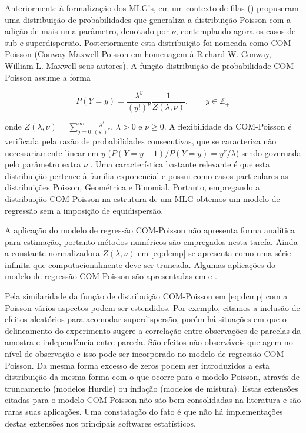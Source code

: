 \documentclass[
12pt,				%
openright,			%
oneside,			%
a4paper,			%
english,			%
brazil,				%
]{abntex2}
\begin{document}
Anteriormente à formalização dos MLG's, em um contexto de filas
 (\citeyear{Conway1962}) propuseram uma
distribuição de probabilidades que 
generaliza a distribuição Poisson com a adição de mais uma parâmetro,
denotado por $\nu$, contemplando agora os casos de sub e
superdispersão. Posteriormente esta distribuição foi nomeada como 
COM-Poisson (Conway-Maxwell-Poisson em homenagem à Richard W. Conway,
William L. Maxwell seus autores). A função distribuição de probabilidade
COM-Poisson assume a forma

\begin{equation} \label{eq:dcmp}
  P(Y = y) = \frac{\lambda^y}{(y!)^\nu} \frac{1}{Z(\lambda, \nu)}, \qquad
  y \in \mathbb{Z}_+
\end{equation}

\noindent
onde $Z(\lambda, \nu) = \sum_{j=0}^\infty \frac{\lambda^s}{(s!)^\nu}$,
$\lambda > 0$ e $\nu \geq 0$. A flexibilidade da COM-Poisson é
verificada pela razão de probabilidades consecutivas, que se caracteriza
não necessariamente linear em $y$ ($P(Y = y - 1) / P(Y = y) = y^\nu /
\lambda$) sendo governada pelo parâmetro extra $\nu$
\cite{Shmueli2005}. Uma característica bastante relevante é que esta
distribuição 
pertence à família exponencial e possui como casos particulares as
distribuições Poisson, Geométrica e Binomial. Portanto, empregando a
distribuição COM-Poisson na estrutura de um MLG obtemos um modelo de
regressão sem a imposição de equidispersão. 

A aplicação do modelo de regressão COM-Poisson não apresenta forma
analítica para estimação, portanto métodos numéricos são empregados
nesta tarefa. Ainda a constante normalizadora $Z(\lambda, \nu)$ em
\ref{eq:dcmp} se apresenta como uma série infinita que
computacionalmente deve ser truncada. Algumas aplicações do modelo
de regressão COM-Poisson são apresentadas em  e
.

Pela similaridade da função de distribuição COM-Poisson em \ref{eq:dcmp}
com a Poisson vários aspectos podem ser estendidos. Por exemplo, citamos
a inclusão de efeitos aleatórios para acomodar superdispersão, porém há
situações em que o delineamento do experimento sugere a correlação entre
observações de parcelas da amostra e independência entre parcela. São
efeitos não observáveis que agem no nível de observação e isso pode ser
incorporado no modelo de regressão COM-Poisson. Da mesma forma excesso
de zeros podem ser introduzidos a esta distribuição da mesma forma com o
que ocorre para o modelo Poisson, através de truncamento (modelos
Hurdle) ou inflação (modelos de mistura). Estas extensões citadas para o
modelo COM-Poisson não são bem consolidadas na literatura e são raras
suas aplicações. Uma constatação do fato é que não há implementações
destas extensões nos principais softwares estatísticos.
\end{document}
